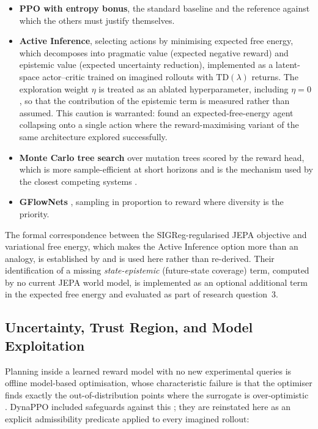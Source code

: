 \documentclass[12pt, a4paper]{article}
\begin{document}
\begin{itemize}
    \item \textbf{PPO with entropy bonus}, the standard baseline and the reference against which the others must justify themselves.
    \item \textbf{Active Inference}, selecting actions by minimising expected free energy, which decomposes into pragmatic value (expected negative reward) and epistemic value (expected uncertainty reduction), implemented as a latent-space actor--critic trained on imagined rollouts with $\mathrm{TD}(\lambda)$ returns. The exploration weight $\eta$ is treated as an ablated hyperparameter, including $\eta = 0$, so that the contribution of the epistemic term is measured rather than assumed. This caution is warranted: \citet{champion2023deconstructing} found an expected-free-energy agent collapsing onto a single action where the reward-maximising variant of the same architecture explored successfully.
    \item \textbf{Monte Carlo tree search} over mutation trees scored by the reward head, which is more sample-efficient at short horizons and is the mechanism used by the closest competing systems \citep{wang2023evoplay, nie2026structevo}.
    \item \textbf{GFlowNets} \citep{jain2022gflownets}, sampling in proportion to reward where diversity is the priority.
\end{itemize}

The formal correspondence between the SIGReg-regularised JEPA objective and variational free energy, which makes the Active Inference option more than an analogy, is established by \citet{arnez2026sigregfree} and is used here rather than re-derived. Their identification of a missing \textit{state-epistemic} (future-state coverage) term, computed by no current JEPA world model, is implemented as an optional additional term in the expected free energy and evaluated as part of research question~3.

\subsection{Uncertainty, Trust Region, and Model Exploitation}
\label{sec:uncertainty}

Planning inside a learned reward model with no new experimental queries is offline model-based optimisation, whose characteristic failure is that the optimiser finds exactly the out-of-distribution points where the surrogate is over-optimistic \citep{kim2025offlinembo, safembo2025}. DynaPPO included safeguards against this \citep{angermueller2020dynappo}; they are reinstated here as an explicit admissibility predicate applied to every imagined rollout:
\end{document}
